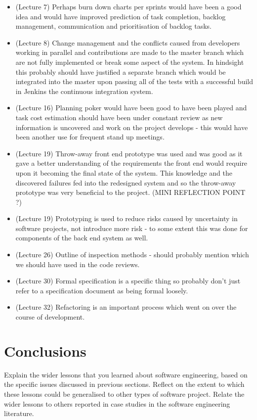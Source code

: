 \documentclass{l3proj}
\begin{document}
\begin{itemize}
\item (Lecture 7) Perhaps burn down charts per sprints would have been a good idea and would have improved prediction of task completion, backlog management, communication and prioritisation of backlog tasks.
\item (Lecture 8) Change management and the conflicts caused from developers working in parallel and contributions are made to the master branch which are not fully implemented or break some aspect of the system. In hindsight this probably should have justified a separate branch which would be integrated into the master upon passing all of the tests with a successful build in Jenkins the continuous integration system.
\item (Lecture 16) Planning poker would have been good to have been played and task cost estimation should have been under constant review as new information is uncovered and work on the project develops - this would have been another use for frequent stand up meetings.
\item (Lecture 19) Throw-away front end prototype was used and was good as it gave a better understanding of the requirements the front end would require upon it becoming the final state of the system. This knowledge and the discovered failures fed into the redesigned system and so the throw-away prototype was very beneficial to the project. (MINI REFLECTION POINT ?)
\item (Lecture 19) Prototyping is used to reduce risks caused by uncertainty in software projects, not introduce more risk - to some extent this was done for components of the back end system as well.
\item (Lecture 26) Outline of inspection methods - should probably mention which we should have used in the code reviews.
\item (Lecture 30) Formal specification is a specific thing so probably don't just refer to a specification document as being formal loosely.
\item (Lecture 32) Refactoring is an important process which went on over the course of development.
\end{itemize}

\section{Conclusions}
\label{sec:conclusions}

Explain the wider lessons that you learned about software engineering,
based on the specific issues discussed in previous sections.  Reflect
on the extent to which these lessons could be generalised to other
types of software project.  Relate the wider lessons to others
reported in case studies in the software engineering literature.



\end{document}
